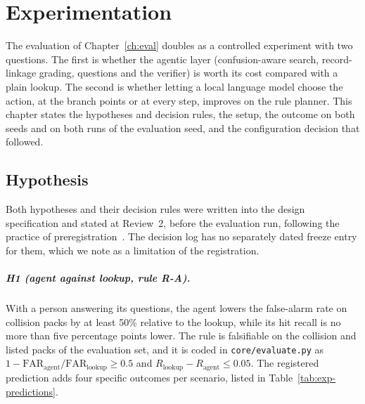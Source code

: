 \chapter{Experimentation}
\label{ch:exp}

The evaluation of Chapter~\ref{ch:eval} doubles as a controlled experiment with two questions. The
first is whether the agentic layer (confusion-aware search, record-linkage grading, questions and
the verifier) is worth its cost compared with a plain lookup. The second is whether letting a local
language model choose the action, at the branch points or at every step, improves on the rule planner. This chapter
states the hypotheses and decision rules, the setup, the outcome on both seeds and on both runs of
the evaluation seed, and the configuration decision that followed.

\section{Hypothesis}
\label{sec:exp-hypothesis}

Both hypotheses and their decision rules were written into the design specification and stated at
Review~2, before the evaluation run, following the practice of preregistration~\cite{nosek2018preregistration}.
The decision log has no separately dated freeze entry for them, which we note as a limitation of
the registration.

\paragraph{H1 (agent against lookup, rule R-A).} With a person answering its questions, the agent
lowers the false-alarm rate on collision packs by at least 50\% relative to the lookup, while its hit
recall is no more than five percentage points lower. The rule is falsifiable on the collision and
listed packs of the evaluation set, and it is coded in \texttt{core/evaluate.py} as
$1-\mathrm{FAR}_{\text{agent}}/\mathrm{FAR}_{\text{lookup}}\geq 0.5$ and
$R_{\text{lookup}}-R_{\text{agent}}\leq 0.05$. The registered prediction adds four specific
outcomes per scenario, listed in Table~\ref{tab:exp-predictions}.

